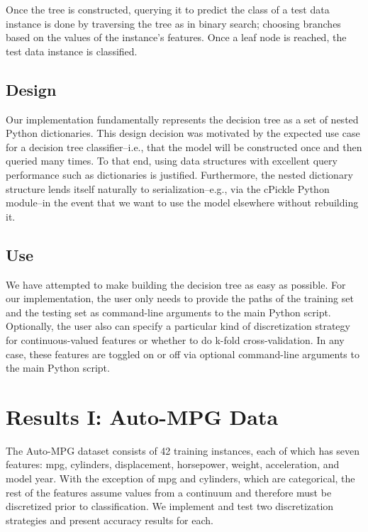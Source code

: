 \documentclass[12pt, conference, compsocconf]{IEEEtran}
\begin{document}
Once the tree is constructed, querying it to predict the class of a test data instance is done by traversing the tree as in binary search; choosing branches based on the values of the instance's features. 
Once a leaf node is reached, the test data instance is classified. 

\subsection{Design}
Our implementation fundamentally represents the decision tree as a set of nested Python dictionaries.
This design decision was motivated by the expected use case for a decision tree classifier--i.e., that the model will be constructed once and then queried many times.
To that end, using data structures with excellent query performance such as dictionaries is justified. 
Furthermore, the nested dictionary structure lends itself naturally to serialization--e.g., via the cPickle Python module--in the event that we want to use the model elsewhere without rebuilding it.  

\subsection{Use}
We have attempted to make building the decision tree as easy as possible.
For our implementation, the user only needs to provide the paths of the training set and the testing set as command-line arguments to the main Python script.
Optionally, the user also can specify a particular kind of discretization strategy for continuous-valued features or whether to do k-fold cross-validation. 
In any case, these features are toggled on or off via optional command-line arguments to the main Python script. 

\section{Results I: Auto-MPG Data}
The Auto-MPG dataset consists of 42 training instances, each of which has seven features: mpg, cylinders, displacement, horsepower, weight, acceleration, and model year. 
With the exception of mpg and cylinders, which are categorical, the rest of the features assume values from a continuum and therefore must be discretized prior to classification. 
We implement and test two discretization strategies and present accuracy results for each.
\end{document}
